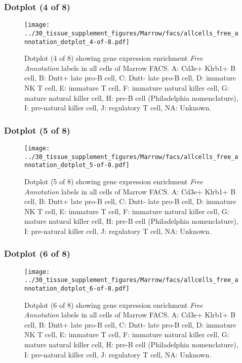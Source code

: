 \clearpage

\subsubsection{Dotplot (4 of 8)}
\begin{figure}[h]
\centering
\texttt{[image: ../30\_tissue\_supplement\_figures/Marrow/facs/allcells\_free\_annotation\_dotplot\_4-of-8.pdf]}

\caption{ Dotplot (4 of 8)  showing gene expression enrichment \emph{Free Annotation} labels in all cells of Marrow FACS. A: Cd3e+ Klrb1+ B cell, B: Dntt+ late pro-B cell, C: Dntt- late pro-B cell, D: immature NK T cell, E: immature T cell, F: immature natural killer cell, G: mature natural killer cell, H: pre-B cell (Philadelphia nomenclature), I: pre-natural killer cell, J: regulatory T cell, NA: Unknown.}
\end{figure}


\clearpage

\subsubsection{Dotplot (5 of 8)}
\begin{figure}[h]
\centering
\texttt{[image: ../30\_tissue\_supplement\_figures/Marrow/facs/allcells\_free\_annotation\_dotplot\_5-of-8.pdf]}

\caption{ Dotplot (5 of 8)  showing gene expression enrichment \emph{Free Annotation} labels in all cells of Marrow FACS. A: Cd3e+ Klrb1+ B cell, B: Dntt+ late pro-B cell, C: Dntt- late pro-B cell, D: immature NK T cell, E: immature T cell, F: immature natural killer cell, G: mature natural killer cell, H: pre-B cell (Philadelphia nomenclature), I: pre-natural killer cell, J: regulatory T cell, NA: Unknown.}
\end{figure}


\clearpage

\subsubsection{Dotplot (6 of 8)}
\begin{figure}[h]
\centering
\texttt{[image: ../30\_tissue\_supplement\_figures/Marrow/facs/allcells\_free\_annotation\_dotplot\_6-of-8.pdf]}

\caption{ Dotplot (6 of 8)  showing gene expression enrichment \emph{Free Annotation} labels in all cells of Marrow FACS. A: Cd3e+ Klrb1+ B cell, B: Dntt+ late pro-B cell, C: Dntt- late pro-B cell, D: immature NK T cell, E: immature T cell, F: immature natural killer cell, G: mature natural killer cell, H: pre-B cell (Philadelphia nomenclature), I: pre-natural killer cell, J: regulatory T cell, NA: Unknown.}
\end{figure}


